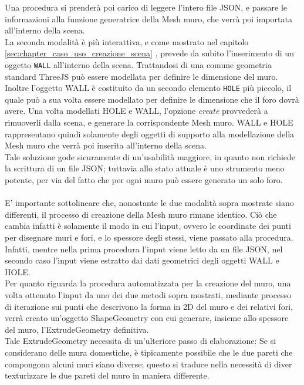 Una procedura si prenderà poi carico di leggere l’intero file JSON, e passare le informazioni alla funzione generatrice della Mesh muro, che verrà poi importata all’interno della scena.
\\
La seconda modalità è più interattiva, e come mostrato nel capitolo \ref{sec:chapter_caso_uso_creazione_scena} , prevede da subito l’inserimento di un oggetto \texttt{WALL} all’interno della scena. Trattandosi di una comune geometria standard ThreeJS può essere modellata per definire le dimensione del muro. Inoltre l’oggetto WALL è costituito da un secondo elemento \texttt{HOLE} più piccolo, il quale può a sua volta essere modellato per definire le dimensione che il foro dovrà avere. Una volta modellati HOLE e WALL, l’opzione \emph{create} provvederà a rimuoverli dalla scena, e generare la corrispondente Mesh muro. WALL e HOLE rappresentano quindi solamente degli oggetti di supporto alla modellazione della Mesh muro che verrà poi inserita all’interno della scena.
\\
Tale soluzione gode sicuramente di un’usabilità maggiore, in quanto non richiede la scrittura di un file JSON; tuttavia allo stato attuale è uno strumento meno potente, per via del fatto che per ogni muro può essere generato un solo foro. 
\\
\\
E’ importante sottolineare che, nonostante le due modalità sopra mostrate siano differenti, il processo di creazione della Mesh muro rimane identico. Ciò che cambia infatti è solamente il modo in cui l’input, ovvero le coordinate dei punti per disegnare muri e fori, e lo spessore degli stessi, viene passato alla procedura. Infatti, mentre nella prima procedura l’input viene letto da un file JSON, nel secondo caso l’input viene estratto dai dati geometrici degli oggetti WALL e HOLE.
\\ 
Per quanto riguarda la procedura automatizzata per la creazione del muro, una volta ottenuto l’input da uno dei due metodi sopra mostrati, mediante processo di iterazione sui punti che descrivono la forma in 2D del muro e dei relativi fori, verrà creato un’oggetto ShapeGeometry con cui generare, insieme allo spessore del muro, l’ExtrudeGeometry definitiva.
\\ 
Tale ExtrudeGeometry necessita di un’ulteriore passo di elaborazione:
Se si considerano delle mura domestiche, è tipicamente possibile che le due pareti che compongono alcuni muri siano diverse; questo si traduce nella necessità di diver texturizzare le due pareti del muro in maniera differente.
